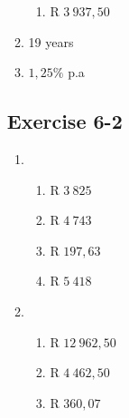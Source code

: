 \begin{enumerate}[label=\textbf{\arabic*}., itemsep=5pt]
\begin{enumerate}[itemsep=6pt, label=\textbf{\arabic*}.]
\begin{enumerate}[noitemsep, label=\textbf{(\alph*)} ]
	    \item R $3~ 937,50$ %
	\end{enumerate}

	\item 19 years %

	\item $1,25\%$ p.a%
    \end{enumerate}

\subsection{Exercise 6-2} %
    \begin{enumerate}[label=\textbf{\arabic*}.]
	\item %
	\begin{enumerate}[noitemsep, label=\textbf{(\alph*)} ]
	    \item R $3~ 825$%
	    \item R $4 ~743$%
	    \item R $197,63$%
	    \item R $5~ 418$%
	\end{enumerate}


	\item %
	\begin{enumerate}[noitemsep, label=\textbf{(\alph*)} ]
	    \item R $12~962,50$%
	    \item R $4~ 462,50$ %
	    \item R $360,07$%
	\end{enumerate}


\end{enumerate}
\end{enumerate}
